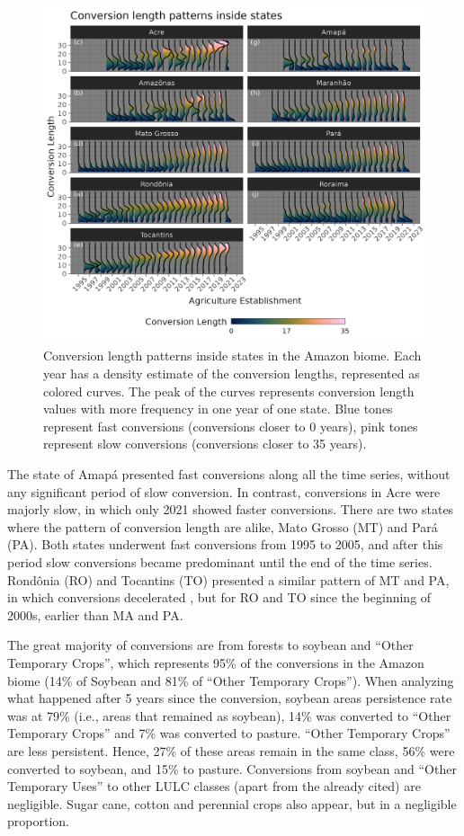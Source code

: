 \documentclass[essd, manuscript]{copernicus}
\begin{document}
\begin{figure}[h]
\includegraphics[width=17cm]{figs/c_ridge} \caption{Conversion length patterns inside states in the Amazon biome. Each year has a density estimate of the conversion lengths, represented as colored curves. The peak of the curves represents conversion length values with more frequency in one year of one state. Blue tones represent fast conversions (conversions closer to 0 years), pink tones represent slow conversions (conversions closer to 35 years).}\label{fig:transridge-plot}
\end{figure}

The state of Amapá presented fast conversions along all the time series, without any significant period of slow conversion.
In contrast, conversions in Acre were majorly slow, in which only 2021 showed faster conversions.
There are two states where the pattern of conversion length are alike, Mato Grosso (MT) and Pará (PA).
Both states underwent fast conversions from 1995 to 2005, and after this period slow conversions became predominant until the end of the time series.
Rondônia (RO) and Tocantins (TO) presented a similar pattern of MT and PA, in which conversions decelerated , but for RO and TO since the beginning of 2000s, earlier than MA and PA.

The great majority of conversions are from forests to soybean and ``Other Temporary Crops'', which represents 95\% of the conversions in the Amazon biome (14\% of Soybean and 81\% of ``Other Temporary Crops'').
When analyzing what happened after 5 years since the conversion, soybean areas persistence rate was at 79\% (i.e., areas that remained as soybean), 14\% was converted to ``Other Temporary Crops'' and 7\% was converted to pasture.
``Other Temporary Crops'' are less persistent.
Hence, 27\% of these areas remain in the same class, 56\% were converted to soybean, and 15\% to pasture.
Conversions from soybean and ``Other Temporary Uses'' to other LULC classes (apart from the already cited) are negligible.
Sugar cane, cotton and perennial crops also appear, but in a negligible proportion.
\end{document}
